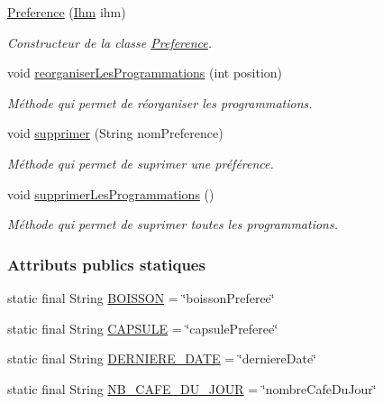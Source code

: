 \begin{DoxyCompactItemize}
\item 
\hyperlink{classcom_1_1example_1_1ekawa_1_1_preference_a2594deda470fb764d1ac8e06cf504411}{Preference} (\hyperlink{classcom_1_1example_1_1ekawa_1_1_ihm}{Ihm} ihm)
\begin{DoxyCompactList}\small\item\em Constructeur de la classe \hyperlink{classcom_1_1example_1_1ekawa_1_1_preference}{Preference}. \end{DoxyCompactList}\item 
void \hyperlink{classcom_1_1example_1_1ekawa_1_1_preference_a98ab818534d930d51fa09de962780fe3}{reorganiser\+Les\+Programmations} (int position)
\begin{DoxyCompactList}\small\item\em Méthode qui permet de réorganiser les programmations. \end{DoxyCompactList}\item 
void \hyperlink{classcom_1_1example_1_1ekawa_1_1_preference_a63914421a8e7b8f79822853e3aff3106}{supprimer} (String nom\+Preference)
\begin{DoxyCompactList}\small\item\em Méthode qui permet de suprimer une préférence. \end{DoxyCompactList}\item 
void \hyperlink{classcom_1_1example_1_1ekawa_1_1_preference_aec0e98bb3cfb4d104c5c86a4259c56b5}{supprimer\+Les\+Programmations} ()
\begin{DoxyCompactList}\small\item\em Méthode qui permet de suprimer toutes les programmations. \end{DoxyCompactList}\end{DoxyCompactItemize}
\subsubsection*{Attributs publics statiques}
\begin{DoxyCompactItemize}
\item 
static final String \hyperlink{classcom_1_1example_1_1ekawa_1_1_preference_a6923224bd12c5b50259e5f376ed58a35}{B\+O\+I\+S\+S\+ON} = \char`\"{}boisson\+Preferee\char`\"{}
\item 
static final String \hyperlink{classcom_1_1example_1_1ekawa_1_1_preference_a64416823eba6f35e817636b31cb12265}{C\+A\+P\+S\+U\+LE} = \char`\"{}capsule\+Preferee\char`\"{}
\item 
static final String \hyperlink{classcom_1_1example_1_1ekawa_1_1_preference_a70095b2dd8748ba4bae554ff09d75d52}{D\+E\+R\+N\+I\+E\+R\+E\+\_\+\+D\+A\+TE} = \char`\"{}derniere\+Date\char`\"{}
\item 
static final String \hyperlink{classcom_1_1example_1_1ekawa_1_1_preference_a75bf6df7d252d793f34494240571a9ee}{N\+B\+\_\+\+C\+A\+F\+E\+\_\+\+D\+U\+\_\+\+J\+O\+UR} = \char`\"{}nombre\+Cafe\+Du\+Jour\char`\"{}
\end{DoxyCompactItemize}
